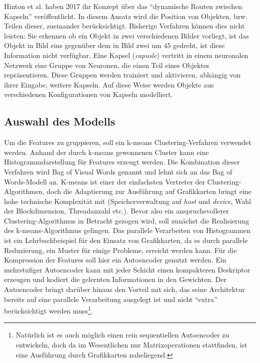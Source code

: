 \newline\newline
Hinton et al. haben 2017 \cite{drc2017} ihr Konzept über das \enquote{dynamische Routen zwischen Kapseln} veröffentlicht. In diesem Ansatz wird die Position von Objekten, bzw. Teilen dieser, zueinander berücksichtigt. Bisherige Verfahren können dies nicht leisten: Sie erkennen ob ein Objekt in zwei verschiedenen Bilder vorliegt, ist das Objekt in Bild eins gegenüber dem in Bild zwei um $45${\degree} gedreht, ist diese Information nicht verfügbar. Eine Kapsel (\textit{capusle}) vertritt in einem neuronalen Netzwerk eine Gruppe von Neuronen, die einen Teil eines Objektes repräsentieren. Diese Gruppen werden trainiert und aktivieren, abhängig von ihrer Eingabe, weitere Kapseln. Auf diese Weise werden Objekte aus verschiedenen Konfigurationen von Kapseln modelliert.

\subsection{Auswahl des Modells}

Um die Features zu gruppieren, soll ein k-means Clustering-Verfahren verwendet werden. Anhand der durch k-means gewonnenen Cluster kann eine Histogrammdarstellung für Features erzeugt werden. Die Kombination dieser Verfahren wird Bag of Visual Words genannt und lehnt sich an das Bag of Words-Modell an. K-means ist einer der einfachsten Vertreter der Clustering-Algorithmen, doch die Adaptierung zur Ausführung auf Grafikkarten bringt eine hohe technische Komplexität mit (Speicherverwaltung auf \textit{host} und \textit{device}, Wahl der Blockdimension, Threadanzahl etc.). Bevor also ein anspruchsvollerer Clustering-Algorithmus in Betracht gezogen wird, soll zunächst die Realisierung des k-means-Algorithmus gelingen. Das parallele Verarbeiten von Histogrammen ist ein Lehrbuchbeispiel für den Einsatz von Grafikkarten, da es durch parallele Reduzierung, ein Muster für einige Probleme, erreicht werden kann. \newline
Für die Kompression der Features soll hier ein Autoencoder genutzt werden. Ein mehrstufiger Autoencoder kann mit jeder Schicht einen kompakteren Deskriptor erzeugen und kodiert die gelernten Informationen in den Gewichten. Der Autoencoder bringt darüber hinaus den Vorteil mit sich, das seine Architektur bereits auf eine parallele Verarbeitung ausgelegt ist und nicht \enquote{extra} berücksichtigt werden muss\footnote{Natürlich ist es auch möglich einen rein sequentiellen Autoencoder zu entwickeln, doch da im Wesentlichen nur Matrixoperationen stattfinden, ist eine Ausführung durch Grafikkarten naheliegend.}.


